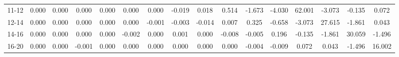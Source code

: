 \documentclass[11pt]{article}
\begin{document}
\begin{table}
\begin{adjustbox}{max width=\textwidth}
\begin{tabular}{c||ccccccccccccccc}
      11-12 & 0.000 & 0.000 & 0.000 & 0.000 & 0.000 & 0.000 & -0.019 & 0.018 & 0.514 & -1.673 & -4.030 & 62.001 & -3.073 & -0.135 & 0.072\\
      12-14 & 0.000 & 0.000 & 0.000 & 0.000 & 0.000 & -0.001 & -0.003 & -0.014 & 0.007 & 0.325 & -0.658 & -3.073 & 27.615 & -1.861 & 0.043\\
      14-16 & 0.000 & 0.000 & 0.000 & 0.000 & -0.002 & 0.000 & 0.001 & 0.000 & -0.008 & -0.005 & 0.196 & -0.135 & -1.861 & 30.059 & -1.496\\
      16-20 & 0.000 & 0.000 & -0.001 & 0.000 & 0.000 & 0.000 & 0.000 & 0.000 & 0.000 & -0.004 & -0.009 & 0.072 & 0.043 & -1.496 & 16.002
    \end{tabular}
  \end{adjustbox}
  \label{tbl:statcov_thetamu_deg_scintillator}
\end{table}
\end{document}
